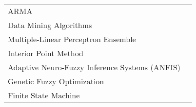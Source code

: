 \begin{table}[ht]
\begin{tabular}{L{8cm} p{5cm}}
ARMA                                                     & \cite{Jin2005Prediction-basedSystems}                                                                                                                                                                                                                                        \\
Data Mining Algorithms                                   & \cite{Kusiak2011MultiObjective}\cite{Kusiak2010}\cite{Kusiak2010ReheatBox}\cite{Kusiak2010ModelingAndOptimization}                                                                                                                                                           \\
Multiple-Linear Perceptron Ensemble                      & \cite{Kusiak2014MinimizationOfEnergyConsumptionInHVAC}\cite{Kusiak2010ModelingAndOptimization}\cite{WeiXiupeng2015}\cite{Kusiak2013MinimizingEnergyConsumption}                                                                                                              \\
Interior Point Method                                    & \cite{Kusiak2014MinimizationOfEnergyConsumptionInHVAC}                                                                                                                                                                                                                       \\
Adaptive Neuro-Fuzzy Inference Systems (ANFIS)           & \cite{LuLu2005HVACSystemOptimization}                                                                                                                                                                                                                                        \\
Genetic Fuzzy Optimization                               & \cite{Parameshwaran2010EnergyAlgorithm}                                                                                                                                                                                                                                      \\
Finite State Machine                                     & \cite{Seem1999}                                                                                                                                                                                                                                                              \\
\bottomrule
\end{tabular}
\end{table}
